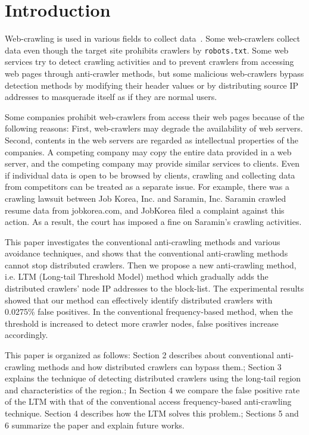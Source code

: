 \documentclass[sigconf,review]{acmart}
\begin{document}
%
%
\section{Introduction}
Web-crawling is used in various fields to collect data~\cite{r11, p2p}. Some web-crawlers collect data even though the target site prohibits crawlers by \texttt{robots.txt}. Some web services try to detect crawling activities and to prevent crawlers from accessing web pages through anti-crawler methods, but some malicious web-crawlers bypass detection methods by modifying their header values or by distributing source IP addresses to masquerade itself as if they are normal users.

Some companies prohibit web-crawlers from access their web pages because of the following reasons: First, web-crawlers may degrade the availability of web servers. Second, contents in the web servers are regarded as intellectual properties of the companies. A competing company may copy the entire data provided in a web server, and the competing company may provide similar services to clients. Even if individual data is open to be browsed by clients, crawling and collecting data from competitors can be treated as a separate issue. For example, there was a crawling lawsuit between Job Korea, Inc. and Saramin, Inc. Saramin crawled resume data from jobkorea.com, and JobKorea filed a complaint against this action. As a result, the court has imposed a fine on Saramin's crawling activities.

This paper investigates the conventional anti-crawling methods and various avoidance techniques, and shows that the conventional anti-crawling methods cannot stop distributed crawlers. Then we propose a new anti-crawling method, i.e. LTM (Long-tail Threshold Model) method which gradually adds the distributed crawlers' node IP addresses to the block-list. The experimental results showed that
our method can effectively identify distributed crawlers with
0.0275\% false positives. In the conventional frequency-based method, when the threshold is increased to detect more crawler nodes, false positives increase accordingly.

This paper is organized as follows: Section 2 describes about conventional anti-crawling methods and how distributed crawlers can bypass them.; Section 3 explains the technique of detecting distributed crawlers using the long-tail region and characteristics of the region.; In Section 4 we compare the false positive rate of the LTM with that of the conventional access frequency-based anti-crawling technique. Section 4 describes how the LTM solves this problem.; Sections 5 and 6 summarize the paper and explain future works. 
\end{document}
